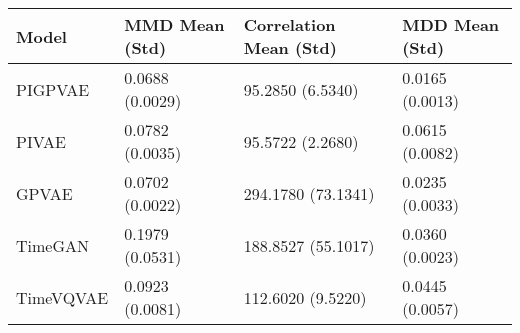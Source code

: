 \begin{tabular}{llll}
\toprule
Model & MMD Mean (Std) & Correlation Mean (Std) & MDD Mean (Std) \\
\midrule
PIGPVAE & 0.0688 (0.0029) & 95.2850 (6.5340) & 0.0165 (0.0013) \\
PIVAE & 0.0782 (0.0035) & 95.5722 (2.2680) & 0.0615 (0.0082) \\
GPVAE & 0.0702 (0.0022) & 294.1780 (73.1341) & 0.0235 (0.0033) \\
TimeGAN & 0.1979 (0.0531) & 188.8527 (55.1017) & 0.0360 (0.0023) \\
TimeVQVAE & 0.0923 (0.0081) & 112.6020 (9.5220) & 0.0445 (0.0057) \\
\bottomrule
\end{tabular}
